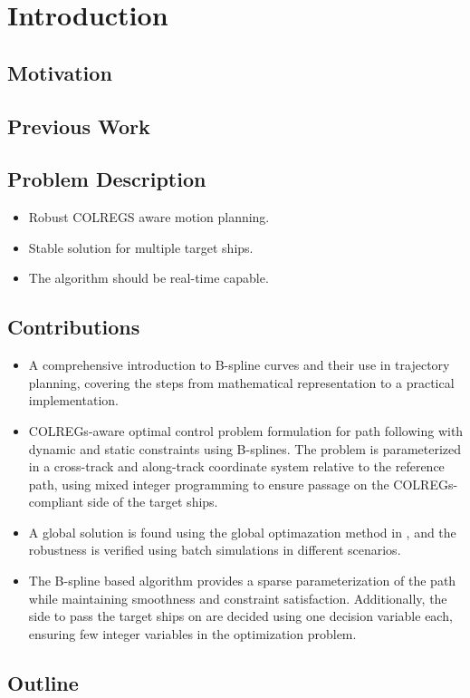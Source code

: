 
\chapter{Introduction}


\section{Motivation}


\section{Previous Work}

\section{Problem Description}
\begin{itemize}
    \item Robust COLREGS aware motion planning. 
    \item Stable solution for multiple target ships.  
    \item The algorithm should be real-time capable.

\end{itemize}
\section{Contributions}

\begin{itemize}
    \item A comprehensive introduction to B-spline curves and their use in trajectory planning, covering the steps from mathematical representation to a practical implementation.
    \item COLREGs-aware optimal control problem formulation for path following with dynamic and static constraints using B-splines. The problem is parameterized in a cross-track and along-track coordinate system relative to the reference path, using mixed integer programming to ensure passage on the COLREGs-compliant side of the target ships.
    \item A global solution is found using the global optimazation method in \citep{Grimstad2016}, and the robustness is verified using batch simulations in different scenarios.
    \item The B-spline based algorithm provides a sparse parameterization of the path while maintaining smoothness and constraint satisfaction. Additionally, the side to pass the target ships on are decided using one decision variable each, ensuring few integer variables in the optimization problem.
\end{itemize}


\section{Outline}
